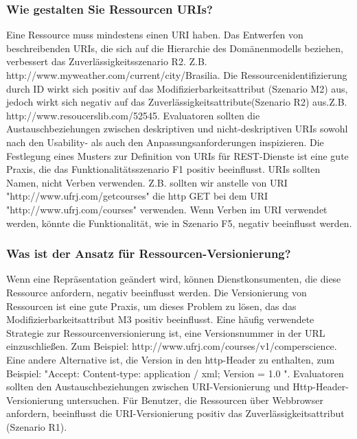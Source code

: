 \documentclass{acmsiggraph}
\begin{document}
\subsubsection{Wie gestalten Sie Ressourcen URIs?}
Eine Ressource muss mindestens einen URI haben.
Das Entwerfen von beschreibenden URIs, die sich auf die Hierarchie des Domänenmodells beziehen, verbessert das Zuverlässigkeitsszenario R2.
\newline Z.B. http://www.myweather.com/current/city/Brasilia. \newline 
Die Ressourcenidentifizierung durch ID wirkt sich positiv auf das Modifizierbarkeitsattribut (Szenario M2) aus, jedoch wirkt sich negativ auf das Zuverlässigkeitsattribute(Szenario R2) aus.\newline Z.B. http://www.resoucerslib.com/52545. \newline
Evaluatoren sollten die  Austauschbeziehungen zwischen deskriptiven und nicht-deskriptiven URIs sowohl nach den Usability- als auch den Anpassungsanforderungen inspizieren. Die Festlegung eines Musters zur Definition von URIs für REST-Dienste ist eine gute Praxis, die das Funktionalitätsszenario F1 positiv beeinflusst.
URIs sollten Namen, nicht Verben verwenden.
Z.B. sollten wir anstelle von URI "http://www.ufrj.com/getcourses" die http GET bei dem URI "http://www.ufrj.com/courses" verwenden. Wenn Verben im URI verwendet werden, könnte die Funktionalität, wie in Szenario F5, negativ beeinflusst werden.
\subsubsection{Was ist der Ansatz für Ressourcen-Versionierung?}
Wenn eine Repräsentation geändert wird, können Dienstkonsumenten, die diese Ressource anfordern, negativ beeinflusst werden. Die Versionierung von Ressourcen ist eine gute Praxis, um dieses Problem zu lösen, das das Modifizierbarkeitsattribut M3 positiv beeinflusst.
Eine häufig verwendete Strategie zur Ressourcenversionierung ist, eine Versionsnummer in der URL einzuschließen. \newline Zum Beispiel: http://www.ufrj.com/courses/v1/comperscience. \newline
Eine andere Alternative ist, die Version in den http-Header zu enthalten, zum Beispiel: "Accept: Content-type: application / xml; Version = 1.0 ". 
Evaluatoren sollten den Austauschbeziehungen zwischen URI-Versionierung und Http-Header-Versionierung untersuchen.
Für Benutzer, die Ressourcen über Webbrowser anfordern, beeinflusst die URI-Versionierung positiv das Zuverlässigkeitsattribut (Szenario R1).
\end{document}
